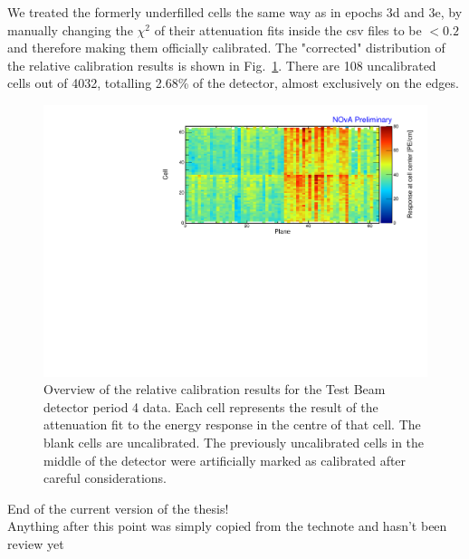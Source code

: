 We treated the formerly underfilled cells the same way as in epochs 3d and 3e, by manually changing the $\chi^2$ of their attenuation fits inside the csv files to be $<0.2$ and therefore making them officially calibrated. The "corrected" distribution of the relative calibration results is shown in Fig.~\ref{fig:CellCentreResponsePeriod4_updated}. There are 108 uncalibrated cells out of 4032, totalling 2.68\% of the detector, almost exclusively on the edges.

\begin{figure}[!hbtp]
\centering
\includegraphics[width=\textwidth]{Plots/TBCalibration/CellResponseAtCentre_period4_Limited_NOvAPlotStyle.pdf}
\caption[Corrected map of fitted response at cell centre for period 4 data]{Overview of the relative calibration results for the Test Beam detector period 4 data. Each cell represents the result of the attenuation fit to the energy response in the centre of that cell. The blank cells are uncalibrated. The previously uncalibrated cells in the middle of the detector were artificially marked as calibrated after careful considerations.}
\label{fig:CellCentreResponsePeriod4_updated}
\end{figure}

\FloatBarrier

\newpage

\begin{center}
\begin{Huge}
\vspace*{3cm}
End of the current version of the thesis!\\[2cm]
Anything after this point was simply copied from the technote and hasn't been review yet
\end{Huge}
\end{center}

